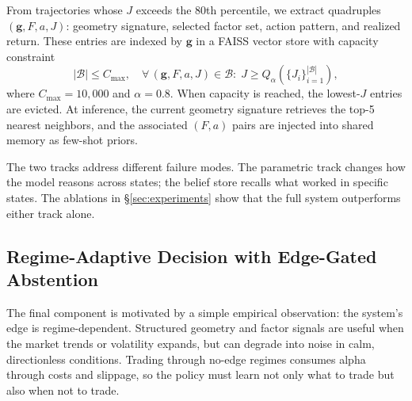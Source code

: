From trajectories whose $J$ exceeds the 80th percentile, we extract quadruples $(\mathbf{g},F,a,J)$: geometry signature, selected factor set, action pattern, and realized return. These entries are indexed by $\mathbf{g}$ in a FAISS vector store with capacity constraint
\begin{equation}
|\mathcal{B}| \leq C_{\max}, \quad \forall\,(\mathbf{g},F,a,J)\in\mathcal{B}:\; J \geq Q_{\alpha}(\{J_i\}_{i=1}^{|\mathcal{B}|}),
\end{equation}
where $C_{\max}=10{,}000$ and $\alpha=0.8$. When capacity is reached, the lowest-$J$ entries are evicted. At inference, the current geometry signature retrieves the top-5 nearest neighbors, and the associated $(F,a)$ pairs are injected into shared memory as few-shot priors.

The two tracks address different failure modes. The parametric track changes how the model reasons across states; the belief store recalls what worked in specific states. The ablations in \S\ref{sec:experiments} show that the full system outperforms either track alone.

\subsection{Regime-Adaptive Decision with Edge-Gated Abstention}
\label{sec:rasw}

The final component is motivated by a simple empirical observation: the system's edge is regime-dependent. Structured geometry and factor signals are useful when the market trends or volatility expands, but can degrade into noise in calm, directionless conditions. Trading through no-edge regimes consumes alpha through costs and slippage, so the policy must learn not only what to trade but also when not to trade.

